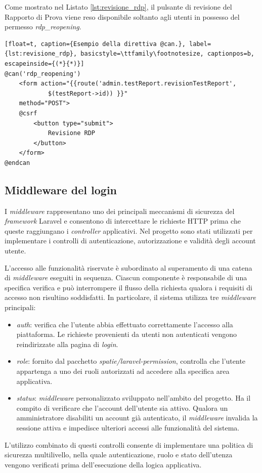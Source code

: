 Come mostrato nel Listato \ref{lst:revisione_rdp}, il pulsante di revisione del Rapporto di Prova viene reso disponibile soltanto agli utenti in possesso del permesso\textit{ rdp\_reopening}.
\begin{lstlisting}[float=t, caption={Esempio della direttiva @can.}, label={lst:revisione_rdp}, basicstyle=\ttfamily\footnotesize, captionpos=b, escapeinside={(*}{*)}]
@can('rdp_reopening')
	<form action="{{route('admin.testReport.revisionTestReport',
			$(testReport->id)) }}"
	method="POST">
	@csrf
		<button type="submit">
			Revisione RDP
		</button>
	</form>
@endcan
\end{lstlisting}

\subsection{Middleware del login}
I \textit{middleware} rappresentano uno dei principali meccanismi di sicurezza del \textit{framework} Laravel e consentono di intercettare le richieste HTTP prima che queste raggiungano i \textit{controller} applicativi. Nel progetto sono stati utilizzati per implementare i controlli di autenticazione, autorizzazione e validità degli account utente.

L'accesso alle funzionalità riservate è subordinato al superamento di una catena di \textit{middleware} eseguiti in sequenza. Ciascun componente è responsabile di una specifica verifica e può interrompere il flusso della richiesta qualora i requisiti di accesso non risultino soddisfatti. In particolare, il sistema utilizza tre \textit{middleware} principali:
\begin{itemize}
	\item \textit{auth}: verifica che l'utente abbia effettuato correttamente l'accesso alla piattaforma. Le richieste provenienti da utenti non autenticati vengono reindirizzate alla pagina di \textit{login}.
	\item \textit{role}: fornito dal pacchetto \textit{spatie/laravel-permission}, controlla che l'utente appartenga a uno dei ruoli autorizzati ad accedere alla specifica area applicativa.
	\item \textit{status}: \textit{middleware} personalizzato sviluppato nell'ambito del progetto. Ha il compito di verificare che l'account dell'utente sia attivo. Qualora un amministratore disabiliti un account già autenticato, il \textit{middleware} invalida la sessione attiva e impedisce ulteriori accessi alle funzionalità del sistema.
\end{itemize}
L'utilizzo combinato di questi controlli consente di implementare una politica di sicurezza multilivello, nella quale autenticazione, ruolo e stato dell'utenza vengono verificati prima dell'esecuzione della logica applicativa.

